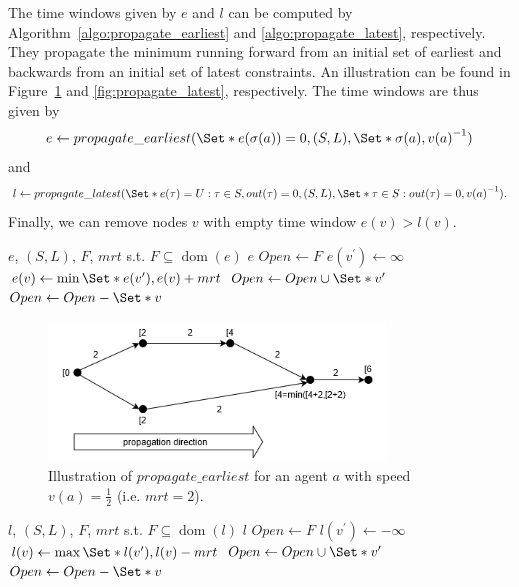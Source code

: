\documentclass{article}
\DeclareMathOperator{\dom}{dom}
\begin{document}
The time windows given by $e$ and $l$ can be computed by Algorithm~\ref{algo:propagate_earliest} and \ref{algo:propagate_latest}, respectively. They propagate the minimum running forward from an initial set of earliest and backwards from an initial set of latest constraints. An illustration can be found in Figure~\ref{fig:propagate_earliest} and \ref{fig:propagate_latest}, respectively.
The time windows are thus given by
$$e\leftarrow propagate\_earliest(\Set*{e(\sigma(a))=0}, (S,L), \Set*{\sigma(a)}, {v(a)}^{-1})$$ and $$l\leftarrow propagate\_latest(\Set*{e(\tau)=U: \tau \in S, out(\tau)=0}, (S,L), \Set*{\tau \in S: out(\tau)=0},{v(a)}^{-1}).$$
Finally, we can remove nodes $v$ with empty time window $e(v)>l(v)$.





\begin{algorithm}
	\caption{$propagate\_earliest$} \label{algo:propagate_earliest}
	\begin{algorithmic}[1]
	    \Require $e$, $(S,L)$, $F$, $mrt$ s.t. $F\subseteq \dom(e)$
	    \Ensure $e$
	    \State $Open \leftarrow F$
    	        \If{$v^\prime \not\in \dom(e)$}
    	            \State $e(v^\prime) \leftarrow \infty$
    	        \EndIf
    			\State $e(v) \leftarrow \min \Set*{e(v^\prime), e(v)+mrt}$
    			\State $Open \leftarrow Open \cup \Set*{v^\prime}$
    		\EndFor
			\State $Open \leftarrow Open - \Set*{v}$
		\EndFor
	\end{algorithmic}
\end{algorithm}

\begin{figure}[hbtp]
	\centering
  \includegraphics[width=0.8\textwidth]{H1_propagate_earliest.png}
	\caption{Illustration of $propagate\_earliest$ for an agent $a$ with speed $v(a)=\frac{1}{2}$ (i.e. $mrt=2$).}
	\label{fig:propagate_earliest}
\end{figure}


\begin{algorithm}
	\caption{$propagate\_latest$} \label{algo:propagate_latest}
	\begin{algorithmic}[1]
	    \Require $l$, $(S,L)$, $F$, $mrt$  s.t. $F\subseteq \dom(l)$
	    \Ensure $l$
	    \State $Open \leftarrow F$
    	        \If{$v^\prime \not\in \dom(l)$}
    	            \State $l(v^\prime) \leftarrow -\infty$
    	        \EndIf
    			\State $l(v) \leftarrow \max \Set*{l(v^\prime), l(v)-mrt}$
    			\State $Open \leftarrow Open \cup \Set*{v^\prime}$
    		\EndFor
			\State $Open \leftarrow Open - \Set*{v}$
		\EndFor
	\end{algorithmic}
\end{algorithm}
\end{document}
